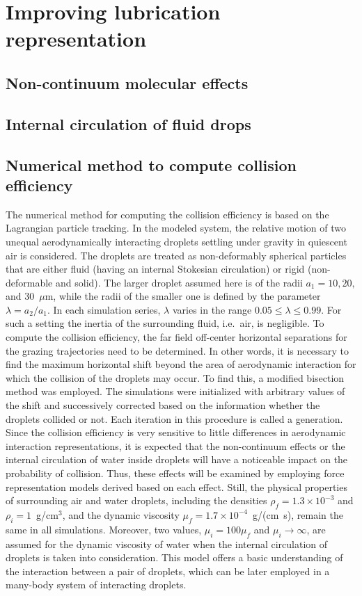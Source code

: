 \documentclass[../thesis.tex]{subfiles}
\begin{document}
\section{Improving lubrication representation\label{sec:eff}}

\subsection{Non-continuum molecular effects}

\subsection{Internal circulation of fluid drops}

\subsection{Numerical method to compute collision efficiency}

The numerical method for computing the collision efficiency is based on the Lagrangian particle tracking. In the modeled system, the relative motion of two unequal aerodynamically interacting droplets settling under gravity in quiescent air is considered. The droplets are treated as non-deformably spherical particles that are either fluid (having an internal Stokesian circulation) or rigid (non-deformable and solid). The larger droplet assumed here is of the radii $a_1=10, 20,$ and 30~$\mu$m, while the radii of the smaller one is defined by the parameter $\lambda= a_2/ a_1$. In each simulation series, $\lambda$ varies in the range $0.05\leq\lambda\leq0.99$. For such a setting the inertia of the surrounding fluid, i.e.\ air, is negligible. To compute the collision efficiency, the far field off-center horizontal separations for the grazing trajectories need to be determined. In other words, it is necessary to find the maximum horizontal shift beyond the area of aerodynamic interaction for which the collision of the droplets may occur. To find this, a modified bisection method was employed. The simulations were initialized with arbitrary values of the shift and successively corrected based on the information whether the droplets collided or not. Each iteration in this procedure is called a generation. Since the collision efficiency is very sensitive to little differences in aerodynamic interaction representations, it is expected that the non-continuum effects or the internal circulation of water inside droplets will have a noticeable impact on the probability of collision. Thus, these effects will be examined by employing force representation models derived based on each effect. Still, the physical properties of surrounding air and water droplets, including the densities $\rho_f = 1.3 \times 10^{-3}$ and $\rho_i=1$~g/cm$^3$, and the dynamic viscosity $\mu_f = 1.7 \times 10^{-4}$~g/(cm~s), remain the same in all simulations. Moreover, two values, $\mu_i = 100\mu_f$ and $\mu_i \to \infty$, are assumed for the dynamic viscosity of water when the internal circulation of droplets is taken into consideration. This model offers a basic understanding of the interaction between a pair of droplets, which can be later employed in a many-body system of interacting droplets.
\end{document}
